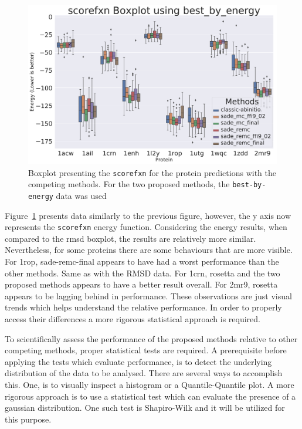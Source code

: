 \begin{figure}
  \includegraphics[width=\linewidth]{Figuras/boxplots/boxplot_best_by_energy_scorefxn.pdf}
  \caption{Boxplot presenting the \texttt{scorefxn} for the protein predictions with the
    competing methods. For the two proposed methods, the \texttt{best-by-energy}
    data was used}
  \label{fig:boxplot-energy}
\end{figure}

Figure~\ref{fig:boxplot-energy} presents data similarly to the previous figure,
however, the y axis now represents the \texttt{scorefxn} energy function. Considering
the energy results, when compared to the rmsd boxplot, the results are relatively
more similar. Nevertheless, for some proteins there are some behaviours that are
more visible. For 1rop, sade-remc-final appears to have had a worst performance
than the other methods. Same as with the RMSD data. For 1crn, rosetta and the two
proposed methods appears to have a better result overall. For 2mr9, rosetta
appears to be lagging behind in performance. These observations are just visual
trends which helps understand the relative performance. In order to properly
access their differences a more rigorous statistical approach is required.

To scientifically assess the performance of the proposed methods relative to
other competing methods, proper statistical tests are required. A prerequisite
before applying the tests which evaluate performance, is to detect the
underlying distribution of the data to be analysed. There are several ways to
accomplish this. One, is to visually inspect a histogram or a Quantile-Quantile
plot. A more rigorous approach is to use a statistical test which can evaluate
the presence of a gaussian distribution. One such test is Shapiro-Wilk and it
will be utilized for this purpose.

